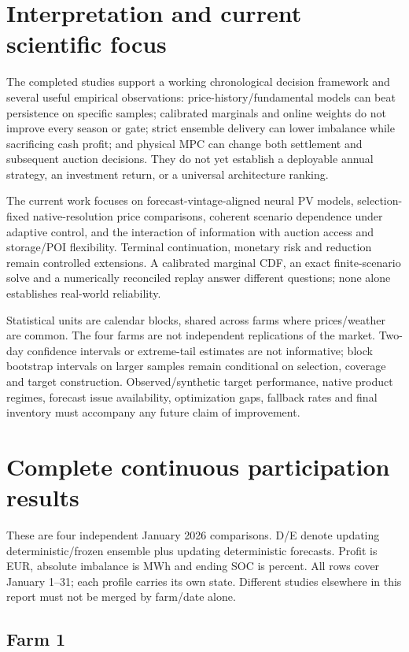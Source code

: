 \section{Interpretation and current scientific focus}
The completed studies support a working chronological decision framework and
several useful empirical observations: price-history/fundamental models can
beat persistence on specific samples; calibrated marginals and online weights
do not improve every season or gate; strict ensemble delivery can lower
imbalance while sacrificing cash profit; and physical MPC can change both
settlement and subsequent auction decisions. They do not yet establish a
deployable annual strategy, an investment return, or a universal architecture
ranking.

The current work focuses on forecast-vintage-aligned neural PV models,
selection-fixed native-resolution price comparisons, coherent scenario
dependence under adaptive control, and the interaction of information with
auction access and storage/POI flexibility. Terminal continuation, monetary
risk and reduction remain controlled extensions. A calibrated marginal CDF,
an exact finite-scenario solve and a numerically reconciled replay answer
different questions; none alone establishes real-world reliability.

Statistical units are calendar blocks, shared across farms where prices/weather
are common. The four farms are not independent replications of the market.
Two-day confidence intervals or extreme-tail estimates are not informative;
block bootstrap intervals on larger samples remain conditional on selection,
coverage and target construction. Observed/synthetic target performance, native
product regimes, forecast issue availability, optimization gaps, fallback rates
and final inventory must accompany any future claim of improvement.

\appendix
\section{Complete continuous participation results}
\label{app:participation}
These are four independent January 2026 comparisons. D/E denote updating
deterministic/frozen ensemble plus updating deterministic forecasts. Profit is
EUR, absolute imbalance is MWh and ending SOC is percent. All rows cover
January 1--31; each profile carries its own state. Different studies elsewhere
in this report must not be merged by farm/date alone.
\subsection{Farm 1}

